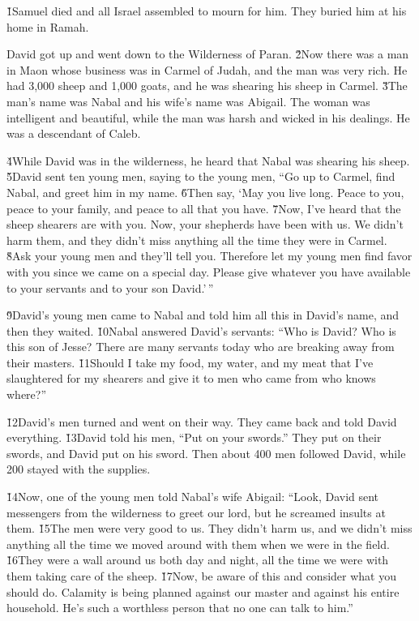 \v{1}Samuel died and all Israel assembled to mourn for him. They buried him at his home in Ramah.

David got up and went down to the Wilderness of Paran. \v{2}Now there was a man in Maon whose business was in Carmel of Judah, and the man was very rich. He had 3,000 sheep and 1,000 goats, and he was shearing his sheep in Carmel. \v{3}The man's name was Nabal and his wife's name was Abigail. The woman was intelligent and beautiful, while the man was harsh and wicked in his dealings. He was a descendant of Caleb.

\v{4}While David was in the wilderness, he heard that Nabal was shearing his sheep. \v{5}David sent ten young men, saying to the young men, ``Go up to Carmel, find Nabal, and greet him in my name. \v{6}Then say, `May you live long. Peace to you, peace to your family, and peace to all that you have. \v{7}Now, I've heard that the sheep shearers are with you. Now, your shepherds have been with us. We didn't harm them, and they didn't miss anything all the time they were in Carmel. \v{8}Ask your young men and they'll tell you. Therefore let my young men find favor with you since we came on a special day. Please give whatever you have available to your servants and to your son David.'\,''

\v{9}David's young men came to Nabal and told him all this in David's name, and then they waited. \v{10}Nabal answered David's servants: ``Who is David? Who is this son of Jesse? There are many servants today who are breaking away from their masters. \v{11}Should I take my food, my water, and my meat that I've slaughtered for my shearers and give it to men who came from who knows where?''

\v{12}David's men turned and went on their way. They came back and told David everything. \v{13}David told his men, ``Put on your swords.'' They put on their swords, and David put on his sword. Then about 400 men followed David, while 200 stayed with the supplies.

\v{14}Now, one of the young men told Nabal's wife Abigail: ``Look, David sent messengers from the wilderness to greet our lord, but he screamed insults at them. \v{15}The men were very good to us. They didn't harm us, and we didn't miss anything all the time we moved around with them when we were in the field. \v{16}They were a wall around us both day and night, all the time we were with them taking care of the sheep. \v{17}Now, be aware of this and consider what you should do. Calamity is being planned against our master and against his entire household. He's such a worthless person that no one can talk to him.''

